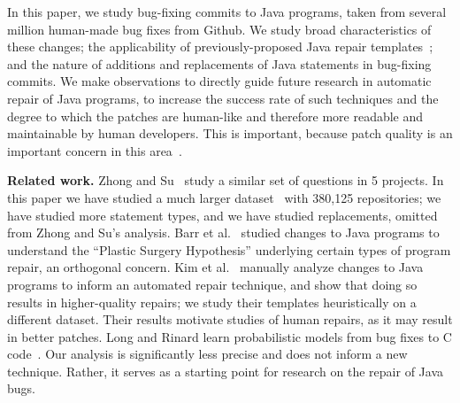 \documentclass{sig-alternate-05-2015}
\begin{document}
In this paper, we study bug-fixing commits to Java programs, 
taken from several million human-made bug fixes from Github. We study broad
characteristics of these changes; the applicability of previously-proposed
Java repair templates~\cite{kim2013}; and the nature
of additions and replacements of Java statements in bug-fixing commits. We make
observations to directly guide future research in automatic repair of Java
programs, to increase the success rate of such techniques and the degree to
which the patches are human-like and therefore more readable and maintainable by
human developers. This is important, because patch quality is an important
concern in this area~\cite{Qi15}.


\vspace{1ex}
\noindent\textbf{Related work.} Zhong and Su~\cite{zhong2015} study
a similar set of questions in 5 projects. In this paper we have studied a much larger dataset~\cite{dyer2013} with 380,125 repositories; we have studied more statement types, and we have studied replacements, omitted from Zhong and Su's analysis.  Barr et al.~\cite{Barr14fse} studied changes to
Java programs to understand the ``Plastic Surgery Hypothesis'' underlying
certain types of program repair, an orthogonal
concern. Kim et al.~\cite{kim2013} manually analyze 
changes to Java programs to inform an automated repair
technique, and show that doing so results in higher-quality repairs; 
we study their templates heuristically on
a different dataset. Their results motivate
studies of human repairs, as it may result in better patches.
Long and Rinard learn probabilistic models from bug fixes to C
code~\cite{Long2016}. Our analysis is significantly less precise and does not
inform a new technique.  Rather, it serves as a starting
point for research on the repair of Java bugs.
\end{document}

